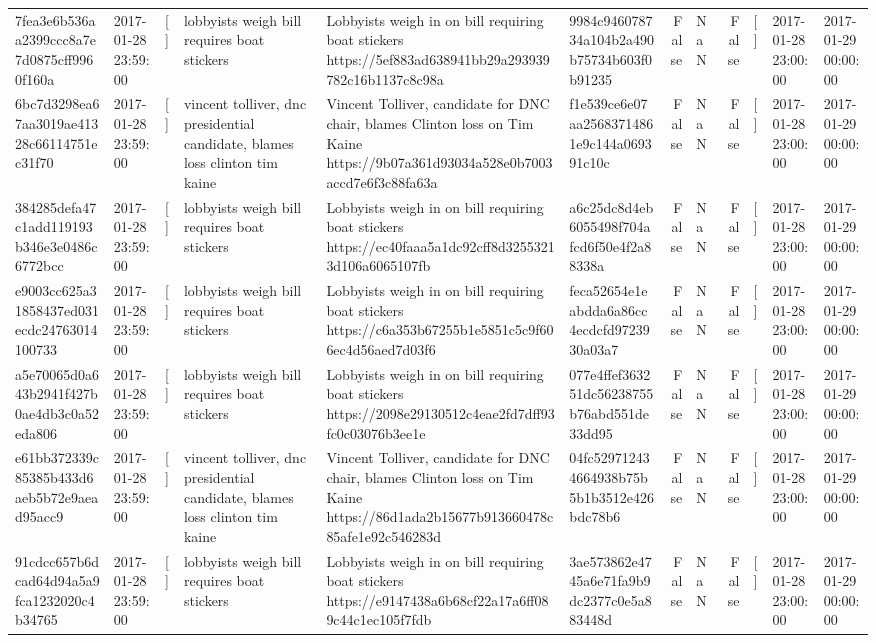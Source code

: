 \begin{tabular}{llllllrlrlll}
7fea3e6b536aa2399ccc8a7e7d0875cff9960f160a & 2017-01-28 23:59:00 & [] & lobbyists weigh bill requires boat stickers & Lobbyists weigh in on bill requiring boat stickers https://5ef883ad638941bb29a293939782c16b1137c8c98a & 9984c946078734a104b2a490b75734b603f0b91235 & False & NaN & False & [] & 2017-01-28 23:00:00 & 2017-01-29 00:00:00 \\
6bc7d3298ea67aa3019ae41328c66114751ec31f70 & 2017-01-28 23:59:00 & [] & vincent tolliver, dnc presidential candidate, blames loss clinton tim kaine & Vincent Tolliver, candidate for DNC chair, blames Clinton loss on Tim Kaine https://9b07a361d93034a528e0b7003accd7e6f3c88fa63a & f1e539ce6e07aa25683714861e9c144a069391c10c & False & NaN & False & [] & 2017-01-28 23:00:00 & 2017-01-29 00:00:00 \\
384285defa47c1add119193b346e3e0486c6772bcc & 2017-01-28 23:59:00 & [] & lobbyists weigh bill requires boat stickers & Lobbyists weigh in on bill requiring boat stickers https://ec40faaa5a1dc92cff8d32553213d106a6065107fb & a6c25dc8d4eb6055498f704afcd6f50e4f2a88338a & False & NaN & False & [] & 2017-01-28 23:00:00 & 2017-01-29 00:00:00 \\
e9003cc625a31858437ed031ecdc24763014100733 & 2017-01-28 23:59:00 & [] & lobbyists weigh bill requires boat stickers & Lobbyists weigh in on bill requiring boat stickers https://c6a353b67255b1e5851c5c9f606ec4d56aed7d03f6 & feca52654e1eabdda6a86cc4ecdcfd9723930a03a7 & False & NaN & False & [] & 2017-01-28 23:00:00 & 2017-01-29 00:00:00 \\
a5e70065d0a643b2941f427b0ae4db3c0a52eda806 & 2017-01-28 23:59:00 & [] & lobbyists weigh bill requires boat stickers & Lobbyists weigh in on bill requiring boat stickers https://2098e29130512c4eae2fd7dff93fc0c03076b3ee1e & 077e4ffef363251dc56238755b76abd551de33dd95 & False & NaN & False & [] & 2017-01-28 23:00:00 & 2017-01-29 00:00:00 \\
e61bb372339c85385b433d6aeb5b72e9aead95acc9 & 2017-01-28 23:59:00 & [] & vincent tolliver, dnc presidential candidate, blames loss clinton tim kaine & Vincent Tolliver, candidate for DNC chair, blames Clinton loss on Tim Kaine https://86d1ada2b15677b913660478c85afe1e92c546283d & 04fc529712434664938b75b5b1b3512e426bdc78b6 & False & NaN & False & [] & 2017-01-28 23:00:00 & 2017-01-29 00:00:00 \\
91cdcc657b6dcad64d94a5a9fca1232020c4b34765 & 2017-01-28 23:59:00 & [] & lobbyists weigh bill requires boat stickers & Lobbyists weigh in on bill requiring boat stickers https://e9147438a6b68cf22a17a6ff089c44c1ec105f7fdb & 3ae573862e4745a6e71fa9b9dc2377c0e5a883448d & False & NaN & False & [] & 2017-01-28 23:00:00 & 2017-01-29 00:00:00 \\

\end{tabular}
